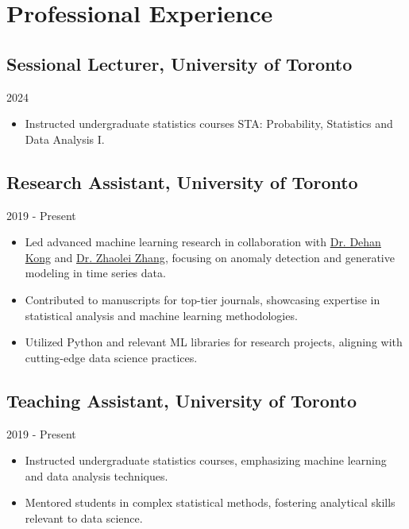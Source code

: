 \section{Professional Experience}
\subsection{Sessional Lecturer, University of Toronto}{2024}
\begin{itemize}[leftmargin=*]
    \item Instructed undergraduate statistics courses STA: Probability, Statistics and Data Analysis I.
\end{itemize}

\subsection{Research Assistant, University of Toronto}{2019 - Present}
\begin{itemize}[leftmargin=*]
    \item Led advanced machine learning research in collaboration with \href{https://www.statistics.utoronto.ca/people/directories/all-faculty/dehan-kong}{Dr. Dehan Kong} and \href{http://sites.utoronto.ca/zhanglab/}{Dr. Zhaolei Zhang}, focusing on anomaly detection and generative modeling in time series data.
    \item Contributed to manuscripts for top-tier journals, showcasing expertise in statistical analysis and machine learning methodologies.
    \item Utilized Python and relevant ML libraries for research projects, aligning with cutting-edge data science practices.
\end{itemize}

\subsection{Teaching Assistant, University of Toronto}{2019 - Present}
\begin{itemize}[leftmargin=*]
    \item Instructed undergraduate statistics courses, emphasizing machine learning and data analysis techniques.
    \item Mentored students in complex statistical methods, fostering analytical skills relevant to data science.
\end{itemize}
